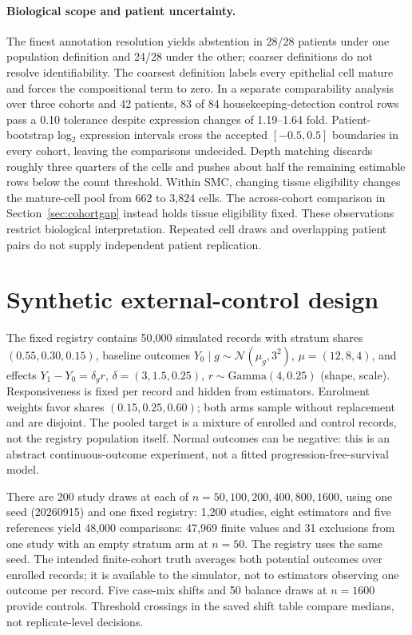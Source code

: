 \paragraph{Biological scope and patient uncertainty.}\label{app:guards}
\label{app:modal}\label{app:limitations}
The finest annotation resolution yields abstention in 28/28 patients under one
population definition and 24/28 under the other; coarser definitions do not
resolve identifiability. The coarsest definition labels every epithelial cell
mature and forces the compositional term to zero. In a separate comparability
analysis over three cohorts and 42 patients, 83 of 84 housekeeping-detection
control rows pass a 0.10 tolerance despite expression changes of 1.19--1.64
fold. Patient-bootstrap log$_2$ expression intervals cross the accepted
$[-0.5,0.5]$ boundaries in every cohort, leaving the comparisons undecided.
Depth matching discards roughly three quarters of the cells and pushes about
half the remaining estimable rows below the count threshold. Within SMC, changing tissue eligibility changes the mature-cell pool from
662 to 3{,}824 cells. The across-cohort comparison in
Section~\ref{sec:cohortgap} instead holds tissue eligibility fixed.
These observations restrict biological interpretation. Repeated cell draws and
overlapping patient pairs do not supply independent patient replication.



\section{Synthetic external-control design}


\label{app:eca}

The fixed registry contains 50{,}000 simulated records with stratum shares
$(0.55,0.30,0.15)$, baseline outcomes $Y_0\mid g\sim
\mathcal N(\mu_g,3^2)$, $\mu=(12,8,4)$, and effects
$Y_1-Y_0=\delta_g r$, $\delta=(3,1.5,0.25)$,
$r\sim\mathrm{Gamma}(4,0.25)$ (shape, scale). Responsiveness is fixed per record
and hidden from estimators. Enrolment weights favor shares $(0.15,0.25,0.60)$;
both arms sample without replacement and are disjoint. The pooled target is a
mixture of enrolled and control records, not the registry population itself.
Normal outcomes can be negative: this is an abstract continuous-outcome
experiment, not a fitted progression-free-survival model.

There are 200 study draws at each of $n=50,100,200,400,800,1600$,
using one seed (20260915) and one fixed registry: 1{,}200 studies, eight
estimators and five references yield 48{,}000 comparisons: 47{,}969 finite
values and 31 exclusions from one study with an empty stratum arm at $n=50$.
The registry uses the same seed. The intended finite-cohort truth averages
both potential outcomes over enrolled records; it is available to the
simulator, not to estimators observing one outcome per record. Five case-mix
shifts and 50 balance draws at $n=1600$ provide controls. Threshold crossings
in the saved shift table compare medians, not replicate-level decisions.

